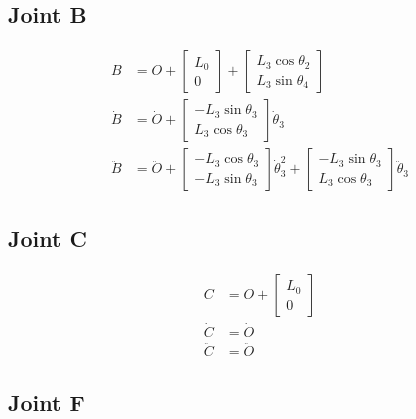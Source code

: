 \documentclass[letterpaper]{article}
\begin{document}
\subsection{Joint B}

\begin{align}
	B &= O + \begin{bmatrix} L_0 \\ 0 \end{bmatrix} + \begin{bmatrix} L_3 \cos \theta_2 \\ L_3 \sin \theta_4 \end{bmatrix} \\
	\dot{B} &= \dot{O} + \begin{bmatrix} -L_3 \sin \theta_3 \\ L_3 \cos \theta_3 \end{bmatrix} \dot{\theta}_3 \\
	\ddot{B} &= \ddot{O} + \begin{bmatrix} -L_3 \cos \theta_3 \\ - L_3 \sin \theta_3 \end{bmatrix} \dot{\theta}_3^2 + \begin{bmatrix} -L_3 \sin \theta_3 \\ L_3 \cos \theta_3 \end{bmatrix} \ddot{\theta}_3 
\end{align}

\subsection{Joint C}
 
\begin{align}
	C &= O + \begin{bmatrix} L_0 \\ 0 \end{bmatrix} \\
	\dot{C} &= \dot{O} \\
	\ddot{C} &= \ddot{O}
\end{align}

\subsection{Joint F}
\end{document}
